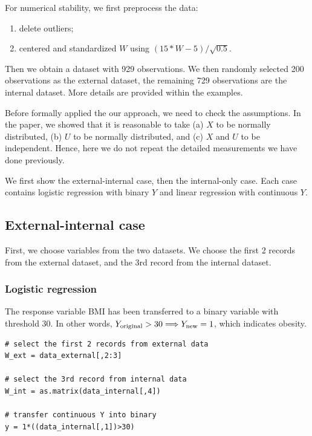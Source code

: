 \documentclass[15 pt,]{article}
\begin{document}
For numerical stability, we first preprocess the data:

\begin{enumerate}
\def\labelenumi{(\arabic{enumi})}
\item
  delete outliers;
\item
  centered and standardized \(W\) using \((15*W - 5)/\sqrt{0.5}\).
\end{enumerate}

Then we obtain a dataset with 929 observations. We then randomly
selected 200 observations as the external dataset, the remaining 729
observations are the internal dataset. More details are provided within
the examples.

Before formally applied the our approach, we need to check the
assumptions. In the paper, we showed that it is reasonable to take (a)
\(X\) to be normally distributed, (b) \(U\) to be normally distributed,
and (c) \(X\) and \(U\) to be independent. Hence, here we do not repeat
the detailed measurements we have done previously.

We first show the external-internal case, then the internal-only case.
Each case contains logistic regression with binary \(Y\) and linear
regression with continuous \(Y\).

\subsection{External-internal case}\label{external-internal-case}

First, we choose variables from the two datasets. We choose the first 2
records from the external dataset, and the 3rd record from the internal
dataset.

\subsubsection{Logistic regression}\label{logistic-regression-1}

The response variable BMI has been transferred to a binary variable with
threshold 30. In other words,
\(Y_{\rm original} > 30\Longrightarrow Y_{\rm new} = 1\), which
indicates obesity.

\begin{verbatim}
# select the first 2 records from external data
W_ext = data_external[,2:3]

# select the 3rd record from internal data
W_int = as.matrix(data_internal[,4])

# transfer continuous Y into binary
y = 1*((data_internal[,1])>30)
\end{verbatim}
\end{document}
